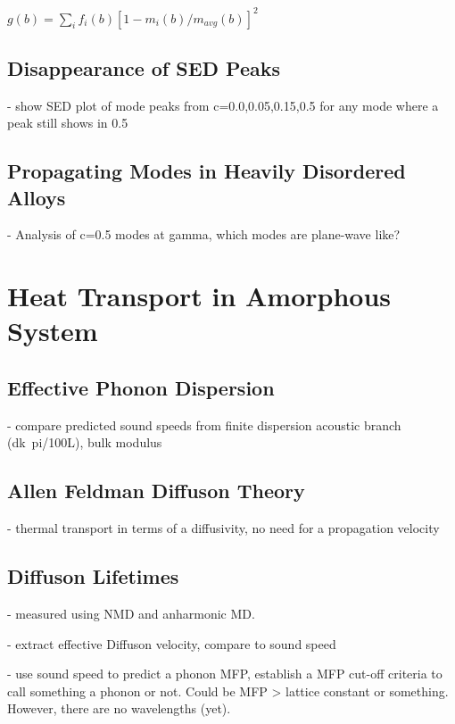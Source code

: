 \documentclass[aps,prl,onecolumn,groupedaddress,amsmath,amssymb,12pt]{revtex4}
\begin{document}
$g(b) = \sum_{i} f_i(b)[1-m_i(b)/m_{avg}(b)]^2$

\subsection{\label{S-Motivation-Amorphous}Disappearance of SED Peaks}

- show SED plot of mode peaks from c=0.0,0.05,0.15,0.5 for any mode where a peak still shows in 0.5

\subsection{\label{S-Motivation-Amorphous}Propagating Modes in Heavily Disordered Alloys}

- Analysis of c=0.5 modes at gamma, which modes are plane-wave like? 


\section{\label{S-Motivation} Heat Transport in Amorphous System}

\subsection{\label{S-Motivation-Amorphous}Effective Phonon Dispersion}

- compare predicted sound speeds from finite dispersion acoustic branch (dk~pi/100L), bulk modulus

\subsection{\label{S-Motivation-Amorphous}Allen Feldman Diffuson Theory}

- thermal transport in terms of a diffusivity, no need for a propagation velocity

\subsection{\label{S-Motivation-Amorphous}Diffuson Lifetimes}

- measured using NMD and anharmonic MD.

- extract effective Diffuson velocity, compare to sound speed

- use sound speed to predict a phonon MFP, establish a MFP cut-off criteria to call something a phonon or not.  Could be MFP > lattice constant or something.  However, there are no wavelengths (yet).
\end{document}
